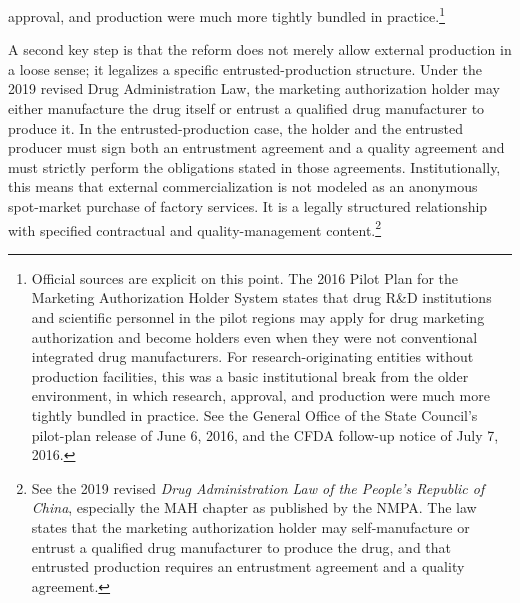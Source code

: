 \documentclass[12pt]{article}
\begin{document}
approval, and production were much more tightly bundled in practice.\footnote{Official sources are explicit on this point. The 2016 Pilot Plan for the Marketing Authorization Holder System states that drug R\&D institutions and scientific personnel in the pilot regions may apply for drug marketing authorization and become holders even when they were not conventional integrated drug manufacturers. For research-originating entities without production facilities, this was a basic institutional break from the older environment, in which research, approval, and production were much more tightly bundled in practice. See the General Office of the State Council's pilot-plan release of June 6, 2016, and the CFDA follow-up notice of July 7, 2016.}

A second key step is that the reform does not merely allow external production in a loose sense; it legalizes a specific entrusted-production structure. Under the 2019 revised Drug Administration Law, the marketing authorization holder may either manufacture the drug itself or entrust a qualified drug manufacturer to produce it. In the entrusted-production case, the holder and the entrusted producer must sign both an entrustment agreement and a quality agreement and must strictly perform the obligations stated in those agreements. Institutionally, this means that external commercialization is not modeled as an anonymous spot-market purchase of factory services. It is a legally structured relationship with specified contractual and quality-management content.\footnote{See the 2019 revised \textit{Drug Administration Law of the People's Republic of China}, especially the MAH chapter as published by the NMPA. The law states that the marketing authorization holder may self-manufacture or entrust a qualified drug manufacturer to produce the drug, and that entrusted production requires an entrustment agreement and a quality agreement.}
\end{document}
